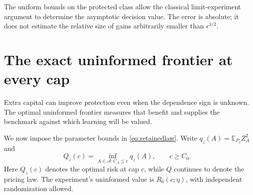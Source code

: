 \documentclass[11pt,a4paper]{amsart}
\theoremstyle{plain}
\theoremstyle{definition}
\theoremstyle{remark}
\newcommand{\EE}{\mathbb{E}}
\newcommand{\calA}{\mathcal{A}}
\begin{document}
The uniform bounds on the protected class allow the classical limit-experiment argument to determine the asymptotic decision value. The error is absolute; it does not estimate the relative size of gains arbitrarily smaller than $\epsilon^{3/2}$.

\section{The exact uninformed frontier at every cap}\label{sec:obstacle}

Extra capital can improve protection even when the dependence sign is unknown. The optimal uninformed frontier measures that benefit and supplies the benchmark against which learning will be valued.

We now impose the parameter bounds in \eqref{eq:retainedlaw}. Write $q_z(A)=\EE_{P_z}Z_A^2$ and
\[
 Q_z(c)=\inf_{A\in\calA:C_A\le c}q_z(A),\qquad c\ge C_0.
\]
Here $Q_z(c)$ denotes the optimal risk at cap $c$, while $Q$ continues to denote the pricing law. The experiment's uninformed value is $R_0(c;\eta)$, with independent randomization allowed.
\end{document}
